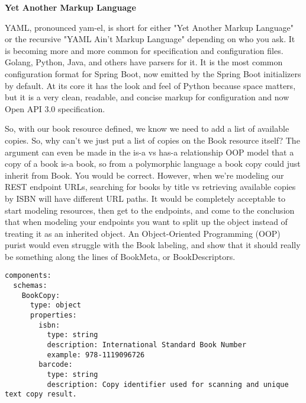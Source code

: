 \begin{sidebar}
\begin{center}
\textbf{Yet Another Markup Language}
\end{center}

YAML, pronounced yam-el, is short for either "Yet Another Markup Language" or the recursive "YAML Ain't Markup Language" depending on who you ask.  It is becoming more and more common for specification and configuration files.  Golang, Python, Java, and others have parsers for it.  It is the most common configuration format for Spring Boot, now emitted by the Spring Boot initializers by default.  At its core it has the look and feel of Python because space matters, but it is a very clean, readable, and concise markup for configuration and now Open API 3.0 specification.

\end{sidebar}

So, with our book resource defined, we know we need to add a list of available copies.  So, why can't we just put a list of copies on the Book resource itself?  The argument can even be made in the is-a vs has-a relationship OOP model that a copy of a book is-a book, so from a polymorphic language a book copy could just inherit from Book.  You would be correct.  However, when we're modeling our REST endpoint URLs, searching for books by title vs retrieving available copies by ISBN will have different URL paths.  It would be completely acceptable to start modeling resources, then get to the endpoints, and come to the conclusion that when modeling your endpoints you want to split up the object instead of treating it as an inherited object.  An Object-Oriented Programming (OOP) purist would even struggle with the Book labeling, and show that it should really be something along the lines of BookMeta, or BookDescriptors.

\begin{minipage}{\linewidth}
\begin{code}
\begin{lstlisting}[belowskip=-\baselineskip]
components:
  schemas:
    BookCopy:
      type: object
      properties:
        isbn:
          type: string
          description: International Standard Book Number
          example: 978-1119096726
        barcode:
          type: string
          description: Copy identifier used for scanning and unique text copy result.
\end{lstlisting}
\end{code}
\end{minipage}

